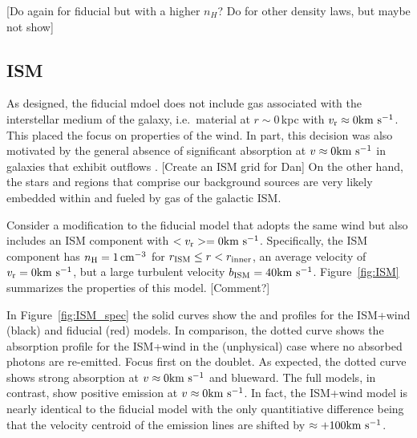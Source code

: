 \documentclass[12pt,preprint]{aastex}
\begin{document}
[Do again for fiducial but with a higher $n_H$?  Do for other density
laws, but maybe not show]

\subsection{ISM}
\label{sec:ISM}

As designed, the fiducial mdoel does not include gas associated with
the interstellar medium of the galaxy, i.e.\ material at $r \sim
0$\,kpc with $v_{\rm r} \approx 0 {\rm km~s^{-1}}$.  This placed the focus on
properties of the wind.  In part, this decision was also motivated by
the general absence of significant absorption at $v \approx 0 {\rm km~s^{-1}}$
in galaxies that exhibit outflows
\citep[e.g.][]{wcp+09,steidel+10,rubin+10}.
[Create an ISM grid for Dan]
On the other hand, the stars and  regions that comprise our
background sources are very likely embedded within and fueled by gas
of the galactic ISM.  

Consider a modification to the fiducial model that adopts the same
wind but also includes an ISM component with $<v_{\rm r}> = 0 {\rm km~s^{-1}}$.  
Specifically, the ISM component has $n_{\rm H} = 1 \, {\rm cm^{-3}}$ for
$r_{\rm ISM} \le r < r_{\rm inner}$, an average velocity of $v_{\rm r} = 0
{\rm km~s^{-1}}$, but a large turbulent velocity $b_{\rm ISM} = 40 {\rm km~s^{-1}}$.
Figure~\ref{fig:ISM} summarizes the properties of this model.
[Comment?]

In Figure~\ref{fig:ISM_spec} the solid curves show the  and
 profiles for the ISM+wind (black) and fiducial (red)
models. In comparison, the
dotted curve shows the absorption profile for the ISM+wind in the (unphysical) case
where no absorbed photons are re-emitted.   Focus first on the
 doublet.  As expected, the dotted curve shows strong
absorption at $v \approx 0 {\rm km~s^{-1}}$ and blueward.  The full models,
in contrast, show positive emission at $v \approx 0 {\rm km~s^{-1}}$.  In
fact, the ISM+wind model is nearly identical to the fiducial model
with the only quantitiative difference being that the velocity centroid of
the emission lines are shifted by $\approx +100 {\rm km~s^{-1}}$.
\end{document}
